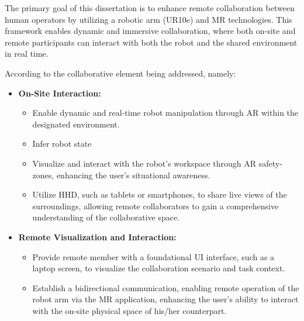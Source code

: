 The primary goal of this dissertation is to enhance remote collaboration between human operators by utilizing a robotic arm (UR10e) and \ac{MR} technologies. This framework enables dynamic and immersive collaboration, where both on-site and remote participants can interact with both the robot and the shared environment in real time. 

According to the collaborative element being addressed, namely: 
\begin{itemize}
    \item \textbf{On-Site Interaction:}
    \begin{itemize}
        \item Enable dynamic and real-time robot manipulation through \ac{AR} within the designated environment.
        \item Infer robot state
        \item Visualize and interact with the robot's workspace through \ac{AR} safety-zones, enhancing the user's situational awareness.
        \item Utilize \ac{HHD}, such as tablets or smartphones, to share live views of the surroundings, allowing remote collaborators 
        to gain a comprehensive understanding of the collaborative space.
    \end{itemize}
    \item \textbf{Remote Visualization and Interaction:}
    \begin{itemize}
        \item Provide remote member with a foundational \ac{UI} interface, such as a laptop screen, to visualize the collaboration scenario and 
        task context.
        \item Establish a bidirectional communication, enabling remote operation of the robot arm via the \ac{MR} application, enhancing the user's ability to interact with the on-site physical space of his/her counterpart.
    \end{itemize}
\end{itemize}


